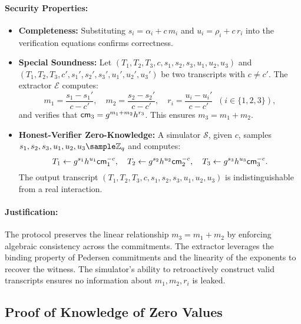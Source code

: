 \paragraph{Security Properties:}
\begin{itemize}
    \item \textbf{Completeness:} Substituting \(s_i = \alpha_i + c\,m_i\) and \(u_i = \rho_i + c\,r_i\) into the verification equations confirms correctness.
    
    \item \textbf{Special Soundness:} Let \((T_1, T_2, T_3, c, s_1, s_2, s_3, u_1, u_2, u_3)\) and \((T_1, T_2, T_3, c', s_1', s_2', s_3', u_1', u_2', u_3')\) be two transcripts with \(c \neq c'\). The extractor \(\mathcal{E}\) computes:
    \[
    m_1 = \frac{s_1 - s_1'}{c - c'}, \quad m_2 = \frac{s_2 - s_2'}{c - c'}, \quad r_i = \frac{u_i - u_i'}{c - c'} \;\; (i \in \{1,2,3\}),
    \]
    and verifies that \(\mathsf{cm}_3 = g^{m_1 + m_2}h^{r_3}\). This ensures \(m_3 = m_1 + m_2\).
    
    \item \textbf{Honest-Verifier Zero-Knowledge:} A simulator \(\mathcal{S}\), given \(c\), samples \(s_1, s_2, s_3, u_1, u_2, u_3 \sample \Z_q\) and computes:
    \[
    T_1 \gets g^{s_1}h^{u_1}\mathsf{cm}_1^{-c}, \quad T_2 \gets g^{s_2}h^{u_2}\mathsf{cm}_2^{-c}, \quad T_3 \gets g^{s_3}h^{u_3}\mathsf{cm}_3^{-c}.
    \]
    The output transcript \((T_1, T_2, T_3, c, s_1, s_2, s_3, u_1, u_2, u_3)\) is indistinguishable from a real interaction.
\end{itemize}

\paragraph{Justification:}  
The protocol preserves the linear relationship \(m_3 = m_1 + m_2\) by enforcing algebraic consistency across the commitments. The extractor leverages the binding property of Pedersen commitments and the linearity of the exponents to recover the witness. The simulator’s ability to retroactively construct valid transcripts ensures no information about \(m_1, m_2, r_i\) is leaked.











\newpage
\subsection{Proof of Knowledge of Zero Values}\label{pok-zero}

